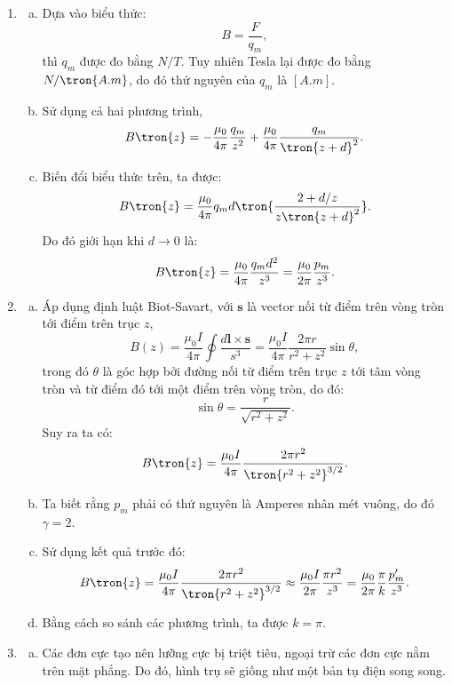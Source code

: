 \begin{loigiai}
\begin{enumerate}[1)]
    \item 
    \begin{enumerate}[a)]
        \item Dựa vào biểu thức:
        $$B=\dfrac{F}{q_m},$$
        thì $q_m$ được đo bằng $N/T$. Tuy nhiên Tesla lại được đo bằng $N/\tron{A.m}$, do đó thứ nguyên của $q_m$ là $\left[A.m\right]$.
        \item Sử dụng cả hai phương trình,
        $$B\tron{z}=-\dfrac{\mu_0}{4\pi}\dfrac{q_m}{z^2}+\dfrac{\mu_0}{4\pi}\dfrac{q_m}{\tron{z+d}^2}.$$
        \item Biến đổi biểu thức trên, ta được:
        $$B\tron{z}=\dfrac{\mu_0}{4\pi}q_md\tron{\dfrac{2+d/z}{z\tron{z+d}^2}}.$$
        Do đó giới hạn khi $d\rightarrow 0$ là:
        $$B\tron{z}=\dfrac{\mu_0}{4\pi}\dfrac{q_m d^2}{z^3}=\dfrac{\mu_0}{2\pi}\dfrac{p_m}{z^3}.$$
    \end{enumerate}
    \item
    \begin{enumerate}[a)]
        \item Áp dụng định luật Biot-Savart, với $\mathbf{s}$ là vector nối từ điểm trên vòng tròn tới điểm trên trục $z$,
        $$ B(z)=\dfrac{\mu_{0} I}{4 \pi} \oint \dfrac{d \mathbf{l} \times \mathbf{s}}{s^{3}}=\dfrac{\mu_{0} I}{4 \pi} \dfrac{2 \pi r}{r^{2}+z^{2}} \sin \theta,$$
        trong đó $\theta$ là góc hợp bởi đường nối từ điểm trên trục $z$ tới tâm vòng tròn và từ điểm đó tới một điểm trên vòng tròn, do đó:
        $$\sin \theta=\dfrac{r}{\sqrt{r^2+z^2}}.$$
        Suy ra ta có:
        $$B\tron{z}=\dfrac{\mu_0I}{4\pi}\dfrac{2\pi r^2}{\tron{r^2+z^2}^{3/2}}.$$
        \item Ta biết rằng $p_m$ phải có thứ nguyên là Amperes nhân mét vuông, do đó $\gamma =2$.
        \item Sử dụng kết quả trước đó:
        $$B\tron{z}=\dfrac{\mu_0 I}{4\pi}\dfrac{2\pi r^2}{\tron{r^2+z^2}^{3/2}}\approx\dfrac{\mu_0 I}{2\pi}\dfrac{\pi r^2}{z^3}=\dfrac{\mu_0}{2\pi}\dfrac{\pi}{k}\dfrac{p'_m}{z^3}.$$
        \item Bằng cách so sánh các phương trình, ta được $k=\pi$.
    \end{enumerate}
    \item 
    \begin{enumerate}[a)]
        \item Các đơn cực tạo nên lưỡng cực bị triệt tiêu, ngoại trừ các đơn cực nằm trên mặt phẳng. Do đó, hình trụ sẽ giống như một bản tụ điện song song.\\

\end{enumerate}
\end{enumerate}
\end{loigiai}
